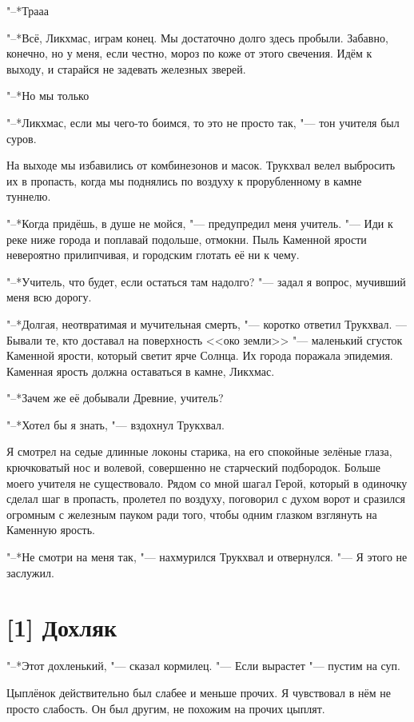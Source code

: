 "--*Трааа\ldotst

"--*Всё, Ликхмас, играм конец.
Мы достаточно долго здесь пробыли.
Забавно, конечно, но у меня, если честно, мороз по коже от этого свечения.
Идём к выходу, и старайся не задевать железных зверей.

"--*Но мы только\ldotst

"--*Ликхмас, если мы чего-то боимся, то это не просто так, "--- тон учителя был суров.

\razd

На выходе мы избавились от комбинезонов и масок.
Трукхвал велел выбросить их в пропасть, когда мы поднялись по воздуху к прорубленному в камне туннелю.

"--*Когда придёшь, в душе не мойся, "--- предупредил меня учитель.
"--- Иди к реке ниже города и поплавай подольше, отмокни.
Пыль Каменной ярости невероятно прилипчивая, и городским глотать её ни к чему.

"--*Учитель, что будет, если остаться там надолго? "--- задал я вопрос, мучивший меня всю дорогу.

"--*Долгая, неотвратимая и мучительная смерть, "--- коротко ответил Трукхвал.
--- Бывали те, кто доставал на поверхность <<око земли>> "--- маленький сгусток Каменной ярости, который светит ярче Солнца.
Их города поражала эпидемия.
Каменная ярость должна оставаться в камне, Ликхмас.

"--*Зачем же её добывали Древние, учитель?

"--*Хотел бы я знать, "--- вздохнул Трукхвал.

Я смотрел на седые длинные локоны старика, на его спокойные зелёные глаза, крючковатый нос и волевой, совершенно не старческий подбородок.
Больше моего учителя не существовало.
Рядом со мной шагал Герой, который в одиночку сделал шаг в пропасть, пролетел по воздуху, поговорил с духом ворот и сразился огромным с железным пауком ради того, чтобы одним глазком взглянуть на Каменную ярость.

"--*Не смотри на меня так, "--- нахмурился Трукхвал и отвернулся.
"--- Я этого не заслужил.

\section{[1] Дохляк}

"--*Этот дохленький, "--- сказал кормилец.
"--- Если вырастет "--- пустим на суп.

Цыплёнок действительно был слабее и меньше прочих.
Я чувствовал в нём не просто слабость.
Он был другим, не похожим на прочих цыплят.


